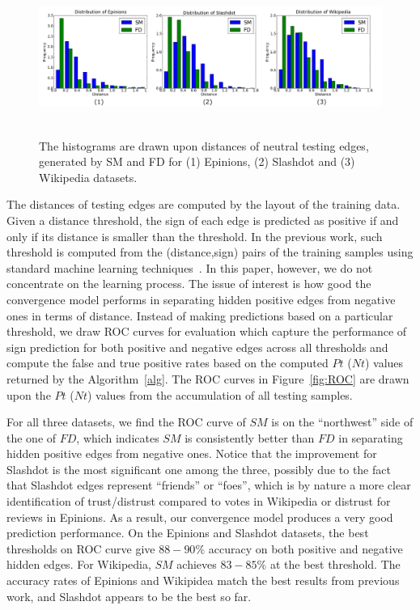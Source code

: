 \begin{figure}[thbp!]
\centering
\includegraphics[height=2in]{Figs/hist1_hor.pdf}
\vspace*{-0.1in}
\caption{\label{hist}The histograms are drawn upon distances of
  neutral testing edges, generated by SM and FD for (1) Epinions, (2)
  Slashdot and (3) Wikipedia datasets.}
\end{figure}

 The distances of testing edges
are computed by the layout of the training data. Given a distance
threshold, the sign of each edge is predicted as positive if and only
if its distance is smaller than the threshold. In the previous work,
such threshold is computed from the (distance,sign) pairs of the
training samples using standard machine learning
techniques~\cite{golbeck:distrust2011}\cite{Leskovec:2010}. In this
paper, however, we do not concentrate on the learning process. The
issue of interest is how good the convergence model performs in
separating hidden positive edges from negative ones in terms of
distance. Instead of making predictions based on a particular
threshold, we draw ROC curves for evaluation which capture the
performance of sign prediction for both positive and negative edges
across all thresholds and compute the false and true positive rates
based on the computed $Pt$ ($Nt$) values returned by the
Algorithm~\ref{alg}. The ROC curves in Figure~\ref{fig:ROC} are drawn
upon the $Pt$ ($Nt$) values from the accumulation of all testing
samples.

For all three datasets, we find the ROC curve of $SM$ is on the
``northwest'' side of the one of $FD$, which indicates $SM$ is
consistently better than $FD$ in separating hidden positive edges from
negative ones. Notice that the improvement for Slashdot is the most
significant one among the three, possibly due to the fact that
Slashdot edges represent ``friends'' or ``foes'', which is by nature a
more clear identification of trust/distrust compared to votes in
Wikipedia or distrust for reviews in Epinions.  As a result, our
convergence model produces a very good prediction performance.  On the
Epinions and Slashdot datasets, the best thresholds on ROC curve give
$88-90 \%$ accuracy on both positive and negative hidden edges. For
Wikipedia, $SM$ achieves $83-85 \%$ at the best threshold. The
accuracy rates of Epinions and Wikipidea match the best results from
previous work, and Slashdot appears to be the best so far.

